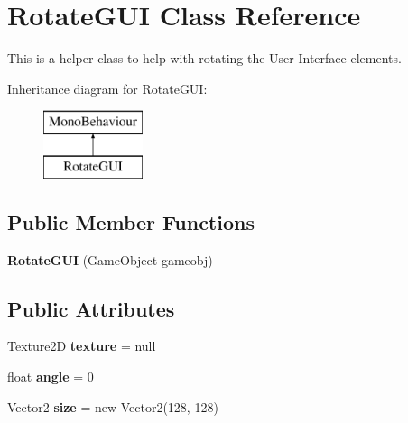 \hypertarget{class_rotate_g_u_i}{\section{Rotate\+G\+U\+I Class Reference}
\label{class_rotate_g_u_i}
}


This is a helper class to help with rotating the User Interface elements.  


Inheritance diagram for Rotate\+G\+U\+I\+:\begin{figure}[H]
\begin{center}
\leavevmode
\includegraphics[height=2.000000cm]{class_rotate_g_u_i}
\end{center}
\end{figure}
\subsection*{Public Member Functions}
\begin{DoxyCompactItemize}
\item 
\hypertarget{class_rotate_g_u_i_ae8e7588323f5a87a6bf5bf17aa467a9c}{{\bfseries Rotate\+G\+U\+I} (Game\+Object gameobj)}\label{class_rotate_g_u_i_ae8e7588323f5a87a6bf5bf17aa467a9c}

\end{DoxyCompactItemize}
\subsection*{Public Attributes}
\begin{DoxyCompactItemize}
\item 
\hypertarget{class_rotate_g_u_i_a99ba2952cb01bdf28171f04f3f339683}{Texture2\+D {\bfseries texture} = null}\label{class_rotate_g_u_i_a99ba2952cb01bdf28171f04f3f339683}

\item 
\hypertarget{class_rotate_g_u_i_a018bfaff1e804ba93d39c81b142f2f6b}{float {\bfseries angle} = 0}\label{class_rotate_g_u_i_a018bfaff1e804ba93d39c81b142f2f6b}

\item 
\hypertarget{class_rotate_g_u_i_a75558c35bc8468bcbb21fcb488a5de4a}{Vector2 {\bfseries size} = new Vector2(128, 128)}\label{class_rotate_g_u_i_a75558c35bc8468bcbb21fcb488a5de4a}

\end{DoxyCompactItemize}


